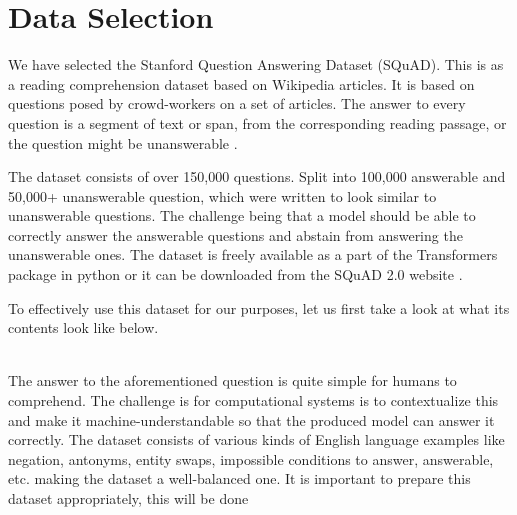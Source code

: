 \documentclass[a4paper,12pt]{report}
\begin{document}
    \section{Data Selection}\label{c31}

    	We have selected the Stanford Question Answering Dataset (SQuAD). This is as a reading comprehension dataset based on Wikipedia articles. It is based on questions posed by crowd-workers on a set of articles. The answer to every question is a segment of text or span, from the corresponding reading passage, or the question might be unanswerable \citep{dataset}.

    	The dataset consists of over 150,000 questions. Split into 100,000 answerable and 50,000+ unanswerable question, which were written to look similar to unanswerable questions. The challenge being that a model should be able to correctly answer the answerable questions and abstain from answering the unanswerable ones.
	    The dataset is freely available as a part of the Transformers package in python or it can be downloaded from the SQuAD 2.0 website \citep{squad}.

	    To effectively use this dataset for our purposes, let us first take a look at what its contents look like below.\\ \\
	    \noindent{}
	    \newline
	    \newline

	    The answer to the aforementioned question is quite simple for humans to comprehend. The challenge is for computational systems is to contextualize this and make it machine-understandable so that the produced model can answer it correctly.
	    The dataset consists of various kinds of English language examples like negation, antonyms, entity swaps, impossible conditions to answer, answerable, etc. making the dataset a well-balanced one.
	    It is important to prepare this dataset appropriately, this will be done
\end{document}

